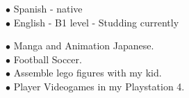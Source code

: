 \documentclass[9pt]{developercv} %
\begin{document}

\begin{minipage}[t]{0.4\textwidth}	
	\vspace{-\baselineskip} %

	$\bullet$ {Spanish} - native\\
	$\bullet$ {English} - B1 level - Studding currently\\


	\vspace{-\baselineskip} %

		$\bullet$ Manga and Animation Japanese.\\
		$\bullet$ Football Soccer.\\  
		$\bullet$ Assemble lego figures with my kid.\\ 
		$\bullet$ Player Videogames in my Playstation 4.

\end{minipage}

\end{document}
